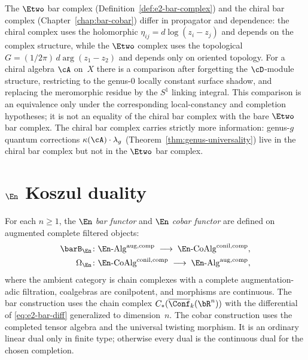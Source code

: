 \begin{remark}
\label{rem:e2-vs-chiral}
The $\Etwo$ bar complex (Definition~\ref{def:e2-bar-complex})
and the chiral bar complex (Chapter~\ref{chap:bar-cobar}) differ in propagator and dependence:
the chiral complex uses the holomorphic $\eta_{ij} = d\log(z_i - z_j)$ and depends on the complex structure,
while the $\Etwo$ complex uses the topological $G = (1/2\pi)\, d\arg(z_1 - z_2)$ and depends only on oriented topology.
For a chiral algebra $\cA$ on~$X$ there is a comparison after
forgetting the $\cD$-module structure, restricting to the genus-$0$
locally constant surface shadow, and replacing the meromorphic
residue by the $S^1$ linking integral. This comparison is an
equivalence only under the corresponding local-constancy and
completion hypotheses; it is not an equality of the chiral bar
complex with the bare $\Etwo$ bar complex.
The chiral bar complex carries strictly more information: genus-$g$ quantum corrections
$\kappa(\cA) \cdot \lambda_g$ (Theorem~\ref{thm:genus-universality})
live in the chiral bar complex but not in the $\Etwo$ bar complex.
\end{remark}



\section{\texorpdfstring{$\En$ Koszul duality}{En Koszul duality}}
\label{sec:en-koszul-duality}

\begin{definition}
\label{def:en-bar-cobar}
For each $n \geq 1$, the \emph{$\En$ bar functor} and \emph{$\En$
cobar functor} are defined on augmented complete filtered objects:
\begin{align}
\barB_{\En} &\colon
 \En\text{-}\mathrm{Alg}^{\mathrm{aug,comp}}
 \;\longrightarrow\;
 \En\text{-}\mathrm{CoAlg}^{\mathrm{conil,comp}},
 \label{eq:en-bar}\\
\Omega_{\En} &\colon
 \En\text{-}\mathrm{CoAlg}^{\mathrm{conil,comp}}
 \;\longrightarrow\;
 \En\text{-}\mathrm{Alg}^{\mathrm{aug,comp}},
 \label{eq:en-cobar}
\end{align}
where the ambient category is chain complexes with a complete
augmentation-adic filtration, coalgebras are conilpotent, and
morphisms are continuous. The bar construction uses the chain complex
$C_*(\overline{\Conf}_k(\bR^n))$ with the differential of
\eqref{eq:e2-bar-diff} generalized to dimension~$n$. The cobar
construction uses the completed tensor algebra and the universal
twisting morphism. It is an ordinary linear dual only in finite type;
otherwise every dual is the continuous dual for the chosen
completion.
\end{definition}

